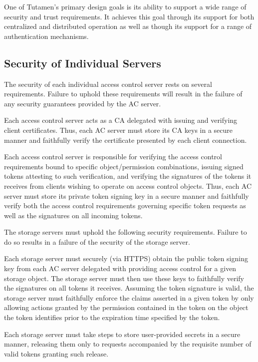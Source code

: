 One of Tutamen's primary design goals is its ability to support a wide
range of security and trust requirements. It achieves this goal
through its support for both centralized and distributed operation as
well as though its support for a range of authentication mechanisms.

\subsection{Security of Individual Servers}

The security of each individual access control server rests on several
requirements. Failure to uphold these requirements will result in the
failure of any security guarantees provided by the AC server.

\begin{packed_desc}
\item[Certificate Authority Role:] Each access control server acts as
  a CA delegated with issuing and verifying client certificates. Thus,
  each AC server must store its CA keys in a secure manner and
  faithfully verify the certificate presented by each client
  connection.
\item[Token Issuance and Verification:] Each access control server is
  responsible for verifying the access control requirements bound to
  specific object/permission combinations, issuing signed tokens
  attesting to such verification, and verifying the signatures of the
  tokens it receives from clients wishing to operate on access control
  objects. Thus, each AC server must store its private token signing
  key in a secure manner and faithfully verify both the access control
  requirements governing specific token requests as well as the
  signatures on all incoming tokens.
\end{packed_desc}

The storage servers must uphold the following security
requirements. Failure to do so results in a failure of the security of
the storage server.

\begin{packed_desc}
\item[Token Verification:] Each storage server must securely (via
  HTTPS) obtain the public token signing key from each AC server
  delegated with providing access control for a given storage
  object. The storage server must then use these keys to faithfully
  verify the signatures on all tokens it receives. Assuming the token
  signature is valid, the storage server must faithfully enforce the
  claims asserted in a given token by only allowing actions granted by
  the permission contained in the token on the object the token
  identifies prior to the expiration time specified by the token.
\item[Secure Storage:] Each storage server must take steps to store
  user-provided secrets in a secure manner, releasing them only to
  requests accompanied by the requisite number of valid tokens
  granting such release.
\end{packed_desc}

